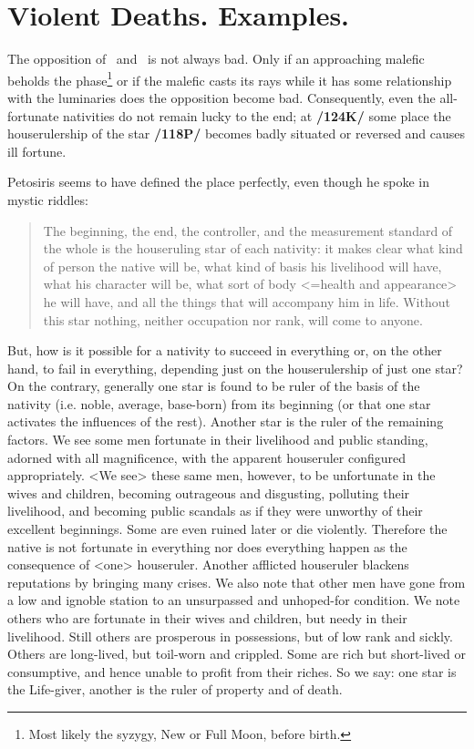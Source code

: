 \section{Violent Deaths. Examples.}

The opposition of \Sun\, and \Moon\, is not always bad. Only if an approaching malefic beholds the phase\footnote{Most likely the syzygy, New or Full Moon, before birth.} or if the malefic casts its rays while it has some relationship with the luminaries does the opposition become bad. Consequently, even the all-fortunate nativities do not remain lucky to the end; at \textbf{/124K/} some place the houserulership of the star \textbf{/118P/} becomes badly situated or reversed and causes ill fortune.

Petosiris seems to have defined the place perfectly, even though he spoke in mystic riddles: \begin{quote}The
beginning, the end, the controller, and the measurement standard of the whole is the houseruling star of each nativity: it makes clear what kind of person the native will be, what kind of basis his livelihood will have, what his character will be, what sort of body <=health and appearance> he will have, and all the things that will accompany him in life. Without this star nothing, neither occupation nor rank, will come to anyone.\end{quote}

But, how is it possible for a nativity to succeed in everything or, on the other hand, to fail in everything, depending just on the houserulership of just one star? On the contrary, generally one star is found to be ruler of the basis of the nativity (i.e. noble, average, base-born) from its beginning (or that one star activates the influences of the rest). Another star is the ruler of the remaining factors. We see some men fortunate in their livelihood and public standing, adorned with all magnificence, with the apparent houseruler configured appropriately. <We see> these same men, however, to be unfortunate in the wives and children, becoming outrageous and disgusting, polluting their livelihood, and becoming public scandals as if they were unworthy of their excellent beginnings. Some are even ruined later or die violently. Therefore the native is not fortunate in everything nor does everything happen as the consequence of <one> houseruler. Another afflicted houseruler blackens reputations by bringing many crises. We also note that other men have gone from a low and ignoble station to an unsurpassed and unhoped-for condition. We note others who are fortunate in their wives and children, but needy in their livelihood. Still others are prosperous in possessions, but of low rank and sickly. Others are long-lived, but toil-worn and crippled. Some are rich but short-lived or consumptive, and hence unable to profit from their riches. So we say: one star is the Life-giver, another is the ruler of property and of death.

